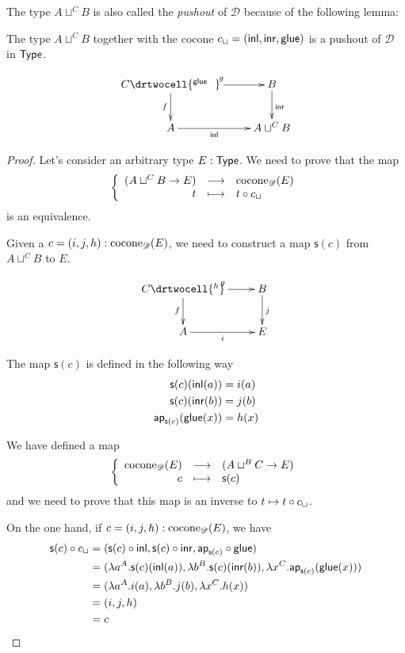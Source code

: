 The type $A\sqcup^CB$ is also called the \emph{pushout} of $\mathscr{D}$ because
of the following lemma:

\begin{lem}
  The type $A\sqcup^CB$ together with the cocone $c_{\sqcup}=(\mathsf{inl},\mathsf{inr},\mathsf{glue})$
  is a pushout of $\mathscr{D}$ in $\mathsf{Type}$.

  \[\uppercurveobject{{ }}\lowercurveobject{{ }}\twocellhead{{ }}
  \xymatrix{C \ar^g[r] \ar_f[d] \drtwocell{^\glue\ \ } & B \ar^\inr[d] \\
    A \ar_-\inl[r] & A\sqcup^CB }\]
\end{lem}
\begin{proof}
  Let’s consider an arbitrary type $E:\mathsf{Type}$. We need to prove that the map
  \[\left\{\begin{array}{rcl}(A\sqcup^CB\to{}E) & \longrightarrow & \mathrm{cocone}_{\mathscr{D}}(E) \\ t & \longmapsto & t\circ c_\sqcup \end{array}\right.\]
  is an equivalence.

  Given a $c=(i,j,h):\mathrm{cocone}_{\mathscr{D}}(E)$, we need to construct a
  map $\mathsf{s}(c)$ from $A\sqcup^CB$ to $E$.

  \[\uppercurveobject{{ }}\lowercurveobject{{ }}\twocellhead{{ }}
  \xymatrix{C \ar^g[r] \ar_f[d] \drtwocell{^h} & B \ar^{j}[d] \\
    A \ar_-{i}[r] & E }\]

 The map $\mathsf{s}(c)$ is defined in the following way
  \begin{align*}
    \mathsf{s}(c)(\mathsf{inl}(a))&=i(a)\\
    \mathsf{s}(c)(\mathsf{inr}(b))&=j(b)\\
    \mathsf{ap}_{\mathsf{s}(c)}(\mathsf{glue}(x))&=h(x)\\
  \end{align*}

We have defined a map
\[\left\{\begin{array}{rcl}\mathrm{cocone}_{\mathscr{D}}(E) & \longrightarrow & (A\sqcup^BC\to{}E) \\ c & \longmapsto & \mathsf{s}(c) \end{array}\right.\]
and we need to prove that this map is an inverse to
$t\mapsto{}t\circ c_\sqcup$.

On the one hand, if $c=(i,j,h):\mathrm{cocone}_{\mathscr{D}}(E)$, we have
\begin{align*}
  \mathsf{s}(c)\circ c_\sqcup & =
  (\mathsf{s}(c)\circ\mathsf{inl},\mathsf{s}(c)\circ\mathsf{inr},
  \mathsf{ap}_{\mathsf{s}(c)}\circ\mathsf{glue}) \\
  & = (\lambda{}a^A.\mathsf{s}(c)(\mathsf{inl}(a)),\lambda{}b^B.\mathsf{s}(c)(\mathsf{inr}(b)),
  \lambda{}x^C.\mathsf{ap}_{\mathsf{s}(c)}(\mathsf{glue}(x))) \\
  & = (\lambda{}a^A.i(a),\lambda{}b^B.j(b),
  \lambda{}x^C.h(x)) \\
  & = (i, j, h) \\
  & = c
\end{align*}


\end{proof}
